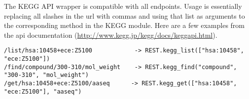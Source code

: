 The KEGG API wrapper is compatible with all endpoints. Usage is essentially replacing all slashes in the url with commas and using that list as arguments to the corresponding method in the KEGG module. Here are a few examples from the api documentation (\url{http://www.kegg.jp/kegg/docs/keggapi.html}).

\begin{verbatim}
/list/hsa:10458+ece:Z5100	         -> REST.kegg_list(["hsa:10458", "ece:Z5100"])
/find/compound/300-310/mol_weight	 -> REST.kegg_find("compound", "300-310", "mol_weight")
/get/hsa:10458+ece:Z5100/aaseq	    -> REST.kegg_get(["hsa:10458", "ece:Z5100"], "aaseq")
\end{verbatim}
